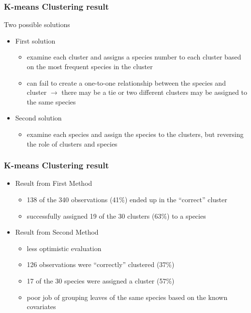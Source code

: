 \documentclass{beamer}
\begin{document}
\begin{frame}
\frametitle{K-means Clustering result}
\begin{center}
Two possible solutions
\begin{itemize}
    \item First solution
       \begin{itemize}
  \item examine each cluster and assigns a species number to each cluster based on the most frequent species in the cluster
  \item can fail to create a one-to-one relationship between the species and cluster $\rightarrow$ there may be a tie or two different clusters may be assigned to the same species
       \end{itemize}
    \item Second solution
        \begin{itemize}
  \item examine each species and assign the species to the clusters, but reversing the role of clusters and species
        \end{itemize}
        \end{itemize}
\end{center}
\end{frame}


\begin{frame}
\frametitle{K-means Clustering result}
\begin{center}
\begin{itemize}
\item Result from First Method
\begin{itemize}
\item 138 of the 340 observations (41\%) ended up in the “correct” cluster
\item successfully assigned 19 of the 30 clusters (63\%) to a species
\end{itemize}
\item Result from Second Method
\begin{itemize}
\item less optimistic evaluation
\item 126 observations were “correctly” clustered (37\%)
\item 17 of the 30 species were assigned a cluster (57\%)
\item poor job of grouping leaves of the same species based on the known covariates
\end{itemize}
\end{itemize}
  
\end{center}
\end{frame}
\end{document}
